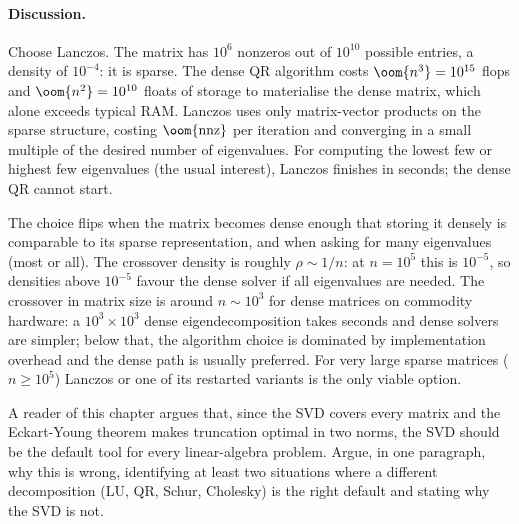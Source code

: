 \paragraph{Discussion.}
Choose Lanczos. The matrix has $10^{6}$ nonzeros out of $10^{10}$
possible entries, a density of $10^{-4}$: it is sparse. The dense
QR algorithm costs $\oom{n^{3}} = 10^{15}$ flops and $\oom{n^{2}} =
10^{10}$ floats of storage to materialise the dense matrix, which
alone exceeds typical RAM. Lanczos uses only matrix-vector products
on the sparse structure, costing $\oom{\text{nnz}}$ per iteration
and converging in a small multiple of the desired number of
eigenvalues. For computing the lowest few or highest few
eigenvalues (the usual interest), Lanczos finishes in seconds; the
dense QR cannot start.

The choice flips when the matrix becomes dense enough that storing
it densely is comparable to its sparse representation, and when
asking for many eigenvalues (most or all). The crossover density is
roughly $\rho \sim 1/n$: at $n = 10^{5}$ this is $10^{-5}$, so
densities above $10^{-5}$ favour the dense solver if all
eigenvalues are needed. The crossover in matrix size is around
$n \sim 10^{3}$ for dense matrices on commodity hardware: a $10^{3}
\times 10^{3}$ dense eigendecomposition takes seconds and dense
solvers are simpler; below that, the algorithm choice is dominated
by implementation overhead and the dense path is usually preferred.
For very large sparse matrices ($n \geq 10^{5}$) Lanczos or one of
its restarted variants is the only viable option.

\begin{exercise}
A reader of this chapter argues that, since the SVD covers every
matrix and the Eckart-Young theorem makes truncation optimal in two
norms, the SVD should be the default tool for every linear-algebra
problem. Argue, in one paragraph, why this is wrong, identifying at
least two situations where a different decomposition (LU, QR, Schur,
Cholesky) is the right default and stating why the SVD is not.
\end{exercise}

